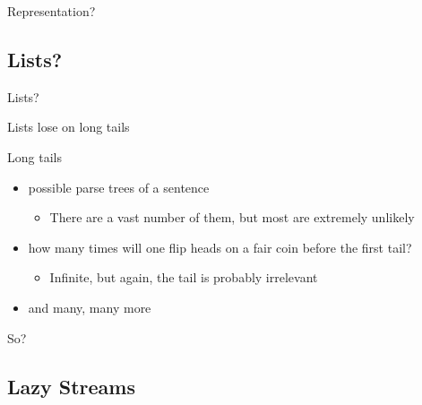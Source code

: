 \documentclass{beamer}
\begin{document}
\begin{frame}
\begin{center}
\Huge Representation?
\end{center}
\end{frame}

\subsection{Lists?}

\begin{frame}
\begin{center}
\Huge Lists?
\end{center}
\end{frame}

\begin{frame}
\begin{center}
\Huge Lists lose on long tails
\end{center}
\end{frame}

\begin{frame}

  {\huge Long tails}

  \begin{itemize}
  \item possible parse trees of a sentence
    \begin{itemize}
    \item There are a vast number of them, but most are extremely unlikely
    \end{itemize}
  \item how many times will one flip heads on a fair coin before the first tail?
    \begin{itemize}
    \item Infinite, but again, the tail is probably irrelevant
    \end{itemize}
  \item and many, many more
  \end{itemize}
\end{frame}

\begin{frame}
\begin{center}
\Huge So?
\end{center}
\end{frame}

\subsection{Lazy Streams}
\end{document}
